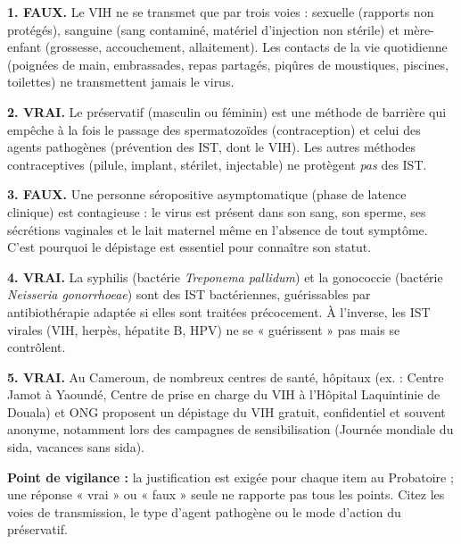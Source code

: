 \documentclass[11pt]{article}
\begin{document}
\begin{corrige}

\textbf{1. FAUX.} Le VIH ne se transmet que par trois voies : sexuelle (rapports non protégés), sanguine (sang contaminé, matériel d'injection non stérile) et mère-enfant (grossesse, accouchement, allaitement). Les contacts de la vie quotidienne (poignées de main, embrassades, repas partagés, piqûres de moustiques, piscines, toilettes) ne transmettent jamais le virus.

\textbf{2. VRAI.} Le préservatif (masculin ou féminin) est une méthode de barrière qui empêche à la fois le passage des spermatozoïdes (contraception) et celui des agents pathogènes (prévention des IST, dont le VIH). Les autres méthodes contraceptives (pilule, implant, stérilet, injectable) ne protègent \emph{pas} des IST.

\textbf{3. FAUX.} Une personne séropositive asymptomatique (phase de latence clinique) est contagieuse : le virus est présent dans son sang, son sperme, ses sécrétions vaginales et le lait maternel même en l'absence de tout symptôme. C'est pourquoi le dépistage est essentiel pour connaître son statut.

\textbf{4. VRAI.} La syphilis (bactérie \emph{Treponema pallidum}) et la gonococcie (bactérie \emph{Neisseria gonorrhoeae}) sont des IST bactériennes, guérissables par antibiothérapie adaptée si elles sont traitées précocement. À l'inverse, les IST virales (VIH, herpès, hépatite B, HPV) ne se « guérissent » pas mais se contrôlent.

\textbf{5. VRAI.} Au Cameroun, de nombreux centres de santé, hôpitaux (ex. : Centre Jamot à Yaoundé, Centre de prise en charge du VIH à l'Hôpital Laquintinie de Douala) et ONG proposent un dépistage du VIH gratuit, confidentiel et souvent anonyme, notamment lors des campagnes de sensibilisation (Journée mondiale du sida, vacances sans sida).

\textbf{Point de vigilance :} la justification est exigée pour chaque item au Probatoire ; une réponse « vrai » ou « faux » seule ne rapporte pas tous les points. Citez les voies de transmission, le type d'agent pathogène ou le mode d'action du préservatif.
\end{corrige}
\end{document}
